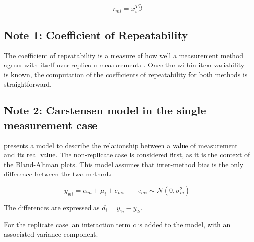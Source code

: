 \documentclass[12pt, a4paper]{report}
\theoremstyle{plain}
\theoremstyle{definition}
\theoremstyle{remark}
\begin{document}
\begin{equation}
r_{mi}=x^{T}_{i}\hat{\beta}
\end{equation}


\subsection{Note 1: Coefficient of Repeatability}
The coefficient of repeatability is a measure of how well a
measurement method agrees with itself over replicate measurements
\citep{BA99}. Once the within-item variability is known, the
computation of the coefficients of repeatability for both methods
is straightforward.



\subsection{Note 2: Carstensen model in the single measurement case}
\citet{BXC2004} presents a model to describe the relationship between a value of measurement and its real value.
The non-replicate case is considered first, as it is the context of the Bland-Altman plots.
This model assumes that inter-method bias is the only difference between the two methods.


\begin{equation}
y_{mi}  = \alpha_{m} + \mu_{i} + e_{mi} \qquad  e_{mi} \sim \mathcal{N}(0,\sigma^{2}_{m})
\end{equation}

The differences are expressed as $d_{i} = y_{1i} - y_{2i}$.

For the replicate case, an interaction term $c$ is added to the model, with an associated variance component.



\newpage
\end{document}
